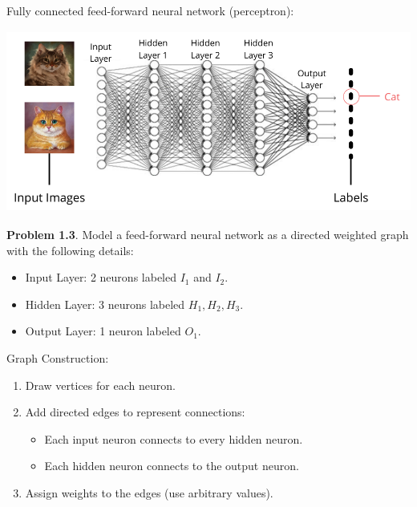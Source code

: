 \documentclass[aspectratio=169]{beamer}
\begin{document}
\begin{frame}[plain]{}

Fully connected feed-forward neural network (perceptron):

	\begin{center}
	      \includegraphics[height=6cm]{./img/lecture1-fig2.png}
	    \end{center}

\end{frame}

\begin{frame}[plain]{}

{\bf Problem 1.3}.  Model a feed-forward neural network as a directed weighted graph with the following details:

  \begin{itemize}
   \item Input Layer: 2 neurons labeled  $I_1$  and  $I_2 $.
   \item Hidden Layer: 3 neurons labeled  $H_1, H_2, H_3 $.
   \item Output Layer: 1 neuron labeled  $O_1$.
   \end{itemize}
   
   Graph Construction:
   \begin{enumerate}
     \item Draw vertices for each neuron.
     \item Add directed edges to represent connections:
        \begin{itemize}
	  \item Each input neuron connects to every hidden neuron.
	  \item Each hidden neuron connects to the output neuron.
       \end{itemize}
     \item Assign weights to the edges (use arbitrary values).  
   \end{enumerate}
   \vspace{.5in}
   
 \end{frame}
\end{document}
